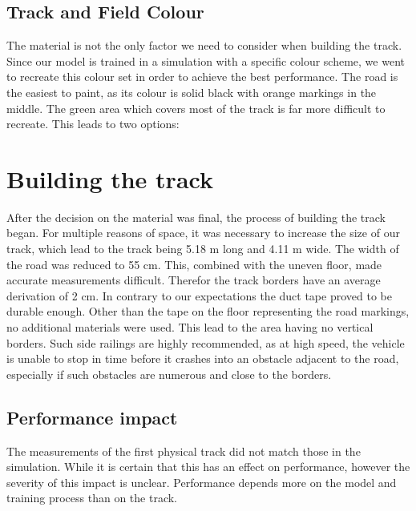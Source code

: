 \subsection{Track and Field Colour}
The material is not the only factor we need to consider when building the track. Since our model is trained in a simulation with a specific colour scheme, we went to recreate this colour set in order to achieve the best performance. The road is the easiest to paint, as its colour is solid black with orange markings in the middle. The green area which covers most of the track is far more difficult to recreate. This leads to two options:

\section{Building the track}
After the decision on the material was final,  the process of building the track began. For multiple reasons of space, it was necessary to increase the size of our track, which lead to the track being 5.18 m long and 4.11 m wide. The width of the road was reduced to 55 cm. This, combined with the uneven floor, made accurate measurements difficult. Therefor the track borders have an average derivation of 2 cm. In contrary to our expectations the duct tape proved to be durable enough. Other than the tape on the floor representing the road markings, no additional materials were used. This lead to the area having no vertical borders. Such side railings are highly recommended, as at high speed, the vehicle is unable to stop in time before it crashes into an obstacle adjacent to the road, especially if such obstacles are numerous and close to the borders.

\subsection{Performance impact}
The measurements of the first physical track did not match those in the simulation. While it is certain that this has an effect on performance, however the severity of this impact is unclear. Performance depends more on the model and training process than on the track.

